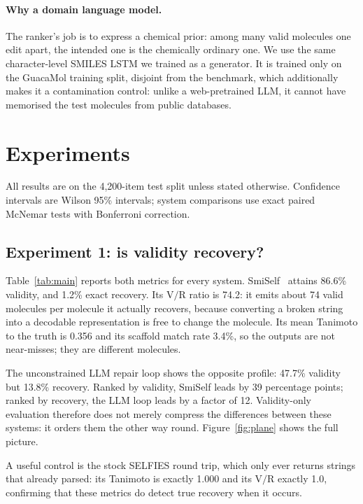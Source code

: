 \documentclass[journal=jcisd8,manuscript=article]{achemso}
\begin{document}
\paragraph{Why a domain language model.}
The ranker's job is to express a chemical prior: among many valid molecules one
edit apart, the intended one is the chemically ordinary one. We use the same
character-level SMILES LSTM we trained as a generator. It is trained only on the
GuacaMol training split, disjoint from the benchmark, which additionally makes
it a contamination control: unlike a web-pretrained LLM, it cannot have
memorised the test molecules from public databases.

\section{Experiments}

All results are on the 4{,}200-item test split unless stated otherwise.
Confidence intervals are Wilson 95\% intervals; system comparisons use exact
paired McNemar tests with Bonferroni correction.

\subsection{Experiment 1: is validity recovery?}\label{sec:exp1}

Table~\ref{tab:main} reports both metrics for every system.
SmiSelf~\citep{smiself2025} attains 86.6\% validity, and 1.2\% exact
recovery. Its $\mathrm{V/R}$ ratio is 74.2: it emits about 74 valid molecules
per molecule it actually recovers, because converting a broken string into a
decodable representation is free to change the molecule. Its mean Tanimoto to
the truth is 0.356 and its scaffold match rate 3.4\%, so the outputs are not
near-misses; they are different molecules.

The unconstrained LLM repair loop shows the opposite profile: 47.7\% validity
but 13.8\% recovery. Ranked by validity, SmiSelf leads by 39 percentage points;
ranked by recovery, the LLM loop leads by a factor of 12. Validity-only
evaluation therefore does not merely compress the differences between these
systems: it orders them the other way round. Figure~\ref{fig:plane} shows the
full picture.

A useful control is the stock SELFIES round trip, which only ever returns
strings that already parsed: its Tanimoto is exactly 1.000 and its
$\mathrm{V/R}$ exactly 1.0, confirming that these metrics do detect true
recovery when it occurs.
\end{document}

